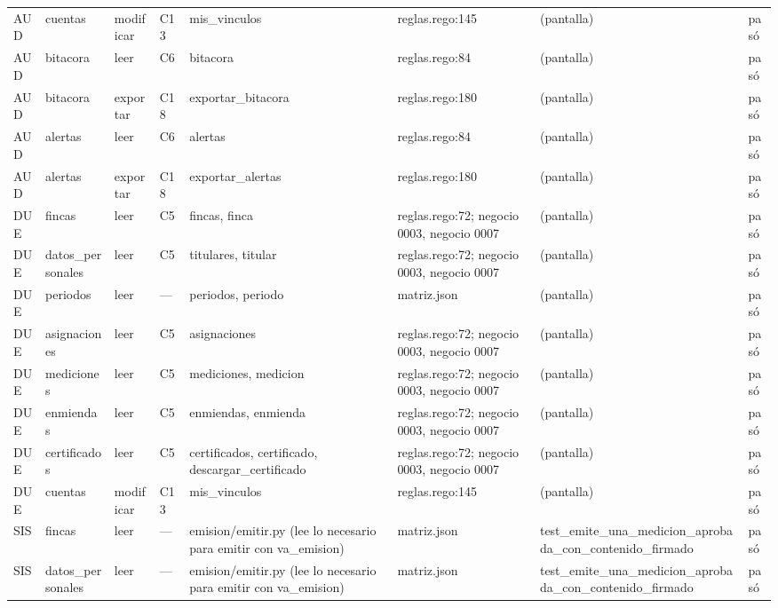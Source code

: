 \documentclass[11pt,letterpaper]{article}
\begin{document}
\begin{center}
\begin{longtable}{@{}p{0.6cm} p{1.7cm} p{1.2cm} p{0.9cm} p{3.4cm} p{2.6cm} p{3.4cm} p{0.8cm}@{}}
AUD & cuentas & modificar & C13 & mis\_vinculos & reglas.rego:145 & (pantalla) & pasó \\
AUD & bitacora & leer & C6 & bitacora & reglas.rego:84 & (pantalla) & pasó \\
AUD & bitacora & exportar & C18 & exportar\_bitacora & reglas.rego:180 & (pantalla) & pasó \\
AUD & alertas & leer & C6 & alertas & reglas.rego:84 & (pantalla) & pasó \\
AUD & alertas & exportar & C18 & exportar\_alertas & reglas.rego:180 & (pantalla) & pasó \\
DUE & fincas & leer & C5 & fincas, \allowbreak{}finca & reglas.rego:72; negocio 0003, negocio 0007 & (pantalla) & pasó \\
DUE & datos\_\allowbreak{}personales & leer & C5 & titulares, \allowbreak{}titular & reglas.rego:72; negocio 0003, negocio 0007 & (pantalla) & pasó \\
DUE & periodos & leer & — & periodos, \allowbreak{}periodo & matriz.json & (pantalla) & pasó \\
DUE & asignaciones & leer & C5 & asignaciones & reglas.rego:72; negocio 0003, negocio 0007 & (pantalla) & pasó \\
DUE & mediciones & leer & C5 & mediciones, \allowbreak{}medicion & reglas.rego:72; negocio 0003, negocio 0007 & (pantalla) & pasó \\
DUE & enmiendas & leer & C5 & enmiendas, \allowbreak{}enmienda & reglas.rego:72; negocio 0003, negocio 0007 & (pantalla) & pasó \\
DUE & certificados & leer & C5 & certificados, \allowbreak{}certificado, \allowbreak{}descargar\_certificado & reglas.rego:72; negocio 0003, negocio 0007 & (pantalla) & pasó \\
DUE & cuentas & modificar & C13 & mis\_vinculos & reglas.rego:145 & (pantalla) & pasó \\
SIS & fincas & leer & — & emision/emitir.py (lee lo necesario para emitir con va\_emision) & matriz.json & test\_\allowbreak{}emite\_\allowbreak{}una\_\allowbreak{}medicion\_\allowbreak{}aprobada\_\allowbreak{}con\_\allowbreak{}contenido\_\allowbreak{}firmado & pasó \\
SIS & datos\_\allowbreak{}personales & leer & — & emision/emitir.py (lee lo necesario para emitir con va\_emision) & matriz.json & test\_\allowbreak{}emite\_\allowbreak{}una\_\allowbreak{}medicion\_\allowbreak{}aprobada\_\allowbreak{}con\_\allowbreak{}contenido\_\allowbreak{}firmado & pasó \\

\end{longtable}
\end{center}
\end{document}
